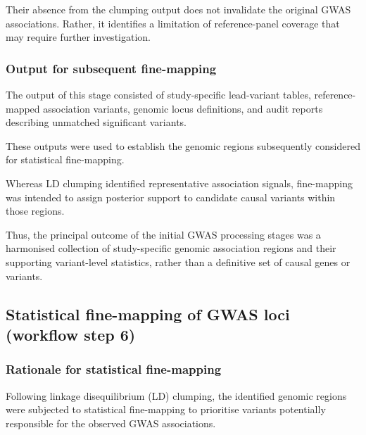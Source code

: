 \documentclass[11pt,a4paper]{article}
\begin{document}
Their absence from the clumping output
does not invalidate the original GWAS
associations. Rather, it identifies a
limitation of reference-panel coverage
that may require further investigation.

\subsubsection{Output for subsequent fine-mapping}

The output of this stage consisted of
study-specific lead-variant tables,
reference-mapped association variants,
genomic locus definitions, and audit
reports describing unmatched significant
variants.

These outputs were used to establish
the genomic regions subsequently
considered for statistical fine-mapping.

Whereas LD clumping identified representative
association signals, fine-mapping was intended
to assign posterior support to candidate
causal variants within those regions.

Thus, the principal outcome of the initial
GWAS processing stages was a harmonised
collection of study-specific genomic
association regions and their supporting
variant-level statistics, rather than a
definitive set of causal genes or variants.

 
%
%
%

\subsection{Statistical fine-mapping of GWAS loci (workflow step 6)}
\label{sec:finemapping}

\subsubsection{Rationale for statistical fine-mapping}

Following linkage disequilibrium (LD) clumping, the
identified genomic regions were subjected to statistical
fine-mapping to prioritise variants potentially responsible
for the observed GWAS associations.
\end{document}

